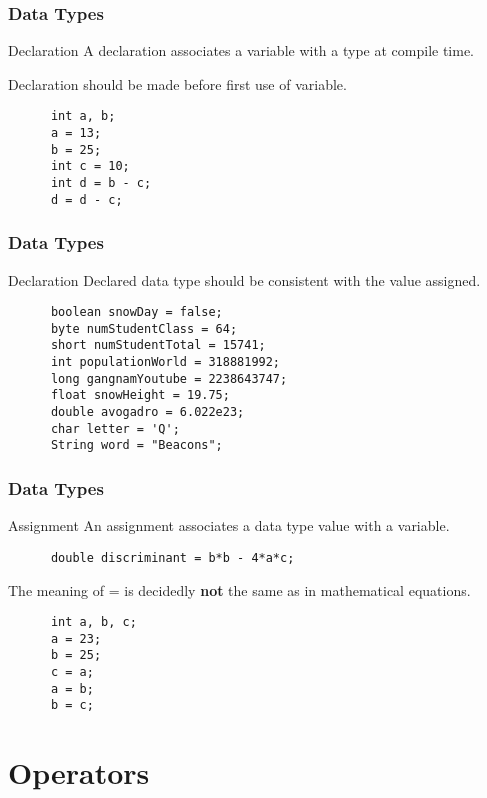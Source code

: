 \documentclass[10pt, compress]{beamer}
\begin{document}
\begin{frame}[fragile]
  \frametitle{Data Types}
  \begin{block}{Declaration}
    A declaration associates a variable with a type at compile time.

    Declaration should be made before first use of variable.
    \begin{verbatim}
      int a, b;
      a = 13;
      b = 25;
      int c = 10;
      int d = b - c;
      d = d - c;
    \end{verbatim}
  \end{block}
\end{frame}

\begin{frame}[fragile]
  \frametitle{Data Types}
  \begin{block}{Declaration}
    Declared data type should be consistent with the value assigned.
    \begin{verbatim}
      boolean snowDay = false;
      byte numStudentClass = 64;
      short numStudentTotal = 15741;
      int populationWorld = 318881992;
      long gangnamYoutube = 2238643747;
      float snowHeight = 19.75;
      double avogadro = 6.022e23;
      char letter = 'Q';
      String word = "Beacons";
    \end{verbatim}
  \end{block}
\end{frame}

\begin{frame}[fragile]
  \frametitle{Data Types}
  \begin{block}{Assignment}
    An assignment associates a data type value with a variable.
    \begin{verbatim}
      double discriminant = b*b - 4*a*c;
    \end{verbatim}
    The meaning of = is decidedly \textbf{not} the same as in mathematical equations.
    \begin{verbatim}
      int a, b, c;
      a = 23;
      b = 25;
      c = a;
      a = b;
      b = c;
    \end{verbatim}
  \end{block}
\end{frame}

\section{Operators}
\end{document}

